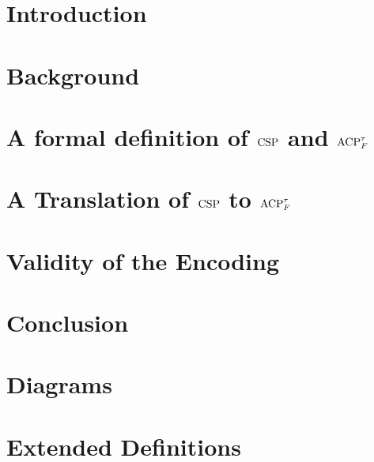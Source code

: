 \documentclass[logo,bsc,singlespacing,parskip,online]{infthesis}
\begin{document}
\chapter{Introduction}


\chapter{Background}


\chapter{A formal definition of \texorpdfstring{$\mathrm{CSP}$}{CSP} and \texorpdfstring{$\mathrm{ACP}_{F}^{\tau}$}{ACP}}


\chapter{A Translation of \texorpdfstring{$\mathrm{CSP}$}{CSP} to \texorpdfstring{$\mathrm{ACP}_{F}^{\tau}$}{ACP}}



\newpage
\chapter{Validity of the Encoding}


\chapter{Conclusion}






\appendix

\chapter{Diagrams}


\chapter{Extended Definitions}

\end{document}
